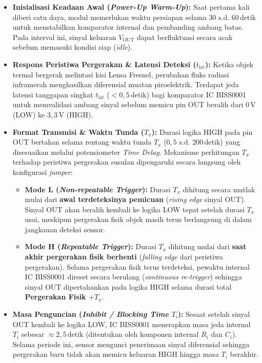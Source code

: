 \begin{itemize}
    \item \textbf{Inisialisasi Keadaan Awal (\textit{Power-Up Warm-Up}):} Saat pertama kali diberi catu daya, modul memerlukan waktu persiapan selama $30\text{ s.d. }60\,\text{detik}$ untuk menstabilkan komparator internal dan pembanding ambang batas. Pada interval ini, sinyal keluaran $V_{\text{OUT}}$ dapat berfluktuasi secara acak sebelum memasuki kondisi siap (\textit{idle}).

    \item \textbf{Respons Peristiwa Pergerakan \& Latensi Deteksi ($t_{\text{lat}}$):} Ketika objek termal bergerak melintasi kisi Lensa Fresnel, perubahan fluks radiasi inframerah menghasilkan diferensial muatan piroelektrik. Terdapat jeda latensi tanggapan singkat $t_{\text{lat}}$ ($< 0{,}5\,\text{detik}$) bagi komparator IC BISS0001 untuk memvalidasi ambang sinyal sebelum memicu pin OUT beralih dari $0\,\text{V}$ (LOW) ke $3{,}3\,\text{V}$ (HIGH).

    \item \textbf{Format Transmisi \& Waktu Tunda ($T_x$):} Durasi logika HIGH pada pin OUT bertahan selama rentang waktu tunda $T_x$ ($0{,}5\text{ s.d. }200\,\text{detik}$) yang disesuaikan melalui potensiometer \textit{Time Delay}. Mekanisme perhitungan $T_x$ terhadap peristiwa pergerakan susulan dipengaruhi secara langsung oleh konfigurasi \textit{jumper}:
          \begin{itemize}
              \item \textbf{Mode L (\textit{Non-repeatable Trigger}):} Durasi $T_x$ dihitung secara mutlak mulai dari \textbf{awal terdeteksinya pemicuan} (\textit{rising edge} sinyal OUT). Sinyal OUT akan beralih kembali ke logika LOW tepat setelah durasi $T_x$ usai, meskipun pergerakan fisik objek masih terus berlangsung di dalam jangkauan deteksi sensor.
              \item \textbf{Mode H (\textit{Repeatable Trigger}):} Durasi $T_x$ dihitung mulai dari \textbf{saat akhir pergerakan fisik berhenti} (\textit{falling edge} dari peristiwa pergerakan). Selama pergerakan fisik terus terdeteksi, pewaktu internal IC BISS0001 direset secara berulang (\textit{continuous re-trigger}) sehingga sinyal OUT dipertahankan pada logika HIGH selama durasi total \textbf{Pergerakan Fisik $+ T_x$}.
          \end{itemize}

    \item \textbf{Masa Penguncian (\textit{Inhibit / Blocking Time} $T_i$):} Sesaat setelah sinyal OUT kembali ke logika LOW, IC BISS0001 menerapkan masa jeda internal $T_i$ sebesar $\approx 2{,}5\,\text{detik}$ (ditentukan oleh komponen internal $R_i$ dan $C_i$). Selama periode ini, sensor mengunci penerimaan sinyal diferensial sehingga pergerakan baru tidak akan memicu keluaran HIGH hingga masa $T_i$ berakhir.
\end{itemize}

